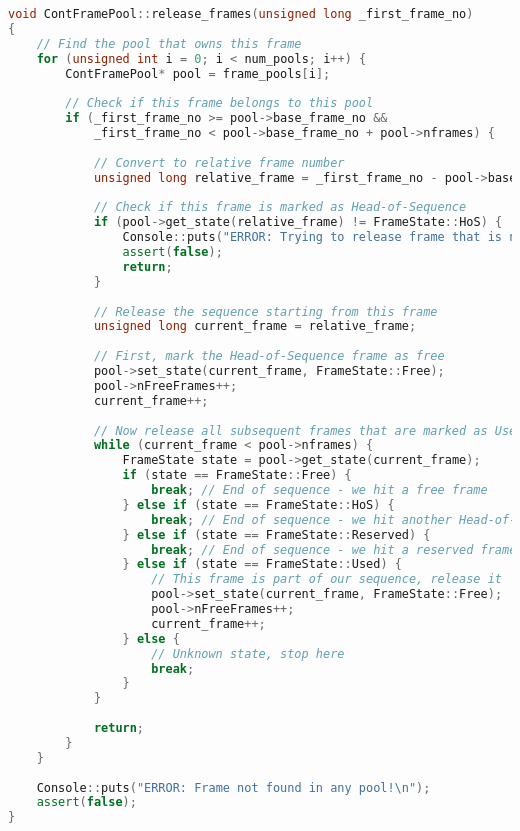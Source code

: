 \documentclass{article}
\begin{document}
\begin{lstlisting}[language=C++, caption=Static Frame Release Method]
void ContFramePool::release_frames(unsigned long _first_frame_no)
{
    // Find the pool that owns this frame
    for (unsigned int i = 0; i < num_pools; i++) {
        ContFramePool* pool = frame_pools[i];
        
        // Check if this frame belongs to this pool
        if (_first_frame_no >= pool->base_frame_no && 
            _first_frame_no < pool->base_frame_no + pool->nframes) {
            
            // Convert to relative frame number
            unsigned long relative_frame = _first_frame_no - pool->base_frame_no;
            
            // Check if this frame is marked as Head-of-Sequence
            if (pool->get_state(relative_frame) != FrameState::HoS) {
                Console::puts("ERROR: Trying to release frame that is not Head-of-Sequence!\n");
                assert(false);
                return;
            }
            
            // Release the sequence starting from this frame
            unsigned long current_frame = relative_frame;
            
            // First, mark the Head-of-Sequence frame as free
            pool->set_state(current_frame, FrameState::Free);
            pool->nFreeFrames++;
            current_frame++;
            
            // Now release all subsequent frames that are marked as Used
            while (current_frame < pool->nframes) {
                FrameState state = pool->get_state(current_frame);
                if (state == FrameState::Free) {
                    break; // End of sequence - we hit a free frame
                } else if (state == FrameState::HoS) {
                    break; // End of sequence - we hit another Head-of-Sequence
                } else if (state == FrameState::Reserved) {
                    break; // End of sequence - we hit a reserved frame (inaccessible)
                } else if (state == FrameState::Used) {
                    // This frame is part of our sequence, release it
                    pool->set_state(current_frame, FrameState::Free);
                    pool->nFreeFrames++;
                    current_frame++;
                } else {
                    // Unknown state, stop here
                    break;
                }
            }
            
            return;
        }
    }
    
    Console::puts("ERROR: Frame not found in any pool!\n");
    assert(false);
}
\end{lstlisting}
\end{document}
